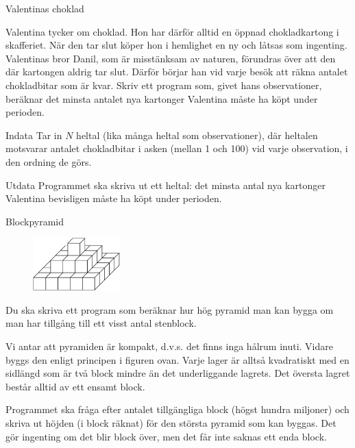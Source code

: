 \documentclass[10pt]{beamer}
\begin{document}
\begin{frame}{Valentinas choklad}

Valentina tycker om choklad. Hon har därför alltid en öppnad chokladkartong i skafferiet. När den tar slut köper hon i hemlighet en ny och låtsas som ingenting. Valentinas bror Danil, som är misstänksam av naturen, förundras över att den där kartongen aldrig tar slut. Därför börjar han vid varje besök att räkna antalet chokladbitar som är kvar. Skriv ett program som, givet hans observationer, beräknar det minsta antalet nya kartonger Valentina måste ha köpt under perioden. 

\begin{exampleblock}{Indata}
Tar in $N$ heltal (lika många heltal som observationer), där heltalen motsvarar antalet chokladbitar i asken (mellan 1 och 100) vid varje observation, i den ordning de görs.
\end{exampleblock}

\begin{exampleblock}{Utdata}
Programmet ska skriva ut ett heltal: det minsta antal nya kartonger Valentina bevisligen måste ha köpt under perioden.
\end{exampleblock}

\end{frame}



\begin{frame}{Blockpyramid}

\begin{figure}[!ht]
\centering
\includegraphics[width=0.3\textwidth]{pyramid.png}
\label{fig:begransningsarea}
\end{figure}

Du ska skriva ett program som beräknar hur hög pyramid man kan bygga om man har tillgång till ett visst antal stenblock.

Vi antar att pyramiden är kompakt, d.v.s. det finns inga hålrum inuti. Vidare byggs den enligt principen i figuren ovan. Varje lager är alltså kvadratiskt med en sidlängd som är två block mindre än det underliggande lagrets. Det översta lagret består alltid av ett ensamt block.

Programmet ska fråga efter antalet tillgängliga block (högst hundra miljoner) och skriva ut höjden (i block räknat) för den största pyramid som kan byggas. Det gör ingenting om det blir block över, men det får inte saknas ett enda block.

\end{frame}
\end{document}
